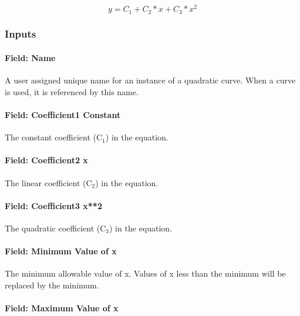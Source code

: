 \begin{equation}
y = {C_1} + {C_2}*x + {C_3}*{x^2}
\end{equation}

\subsubsection{Inputs}\label{inputs-2-026}

\paragraph{Field: Name}\label{field-name-2-025}

A user assigned unique name for an instance of a quadratic curve. When a curve is used, it is referenced by this name.

\paragraph{Field: Coefficient1 Constant}\label{field-coefficient1-constant-2}

The constant coefficient (C\(_{1}\)) in the equation.

\paragraph{Field: Coefficient2 x}\label{field-coefficient2-x-1}

The linear coefficient (C\(_{2}\)) in the equation.

\paragraph{Field: Coefficient3 x**2}\label{field-coefficient3-x2}

The quadratic coefficient (C\(_{3}\)) in the equation.

\paragraph{Field: Minimum Value of x}\label{field-minimum-value-of-x-2}

The minimum allowable value of x. Values of x less than the minimum will be replaced by the minimum.

\paragraph{Field: Maximum Value of x}\label{field-maximum-value-of-x-2}

